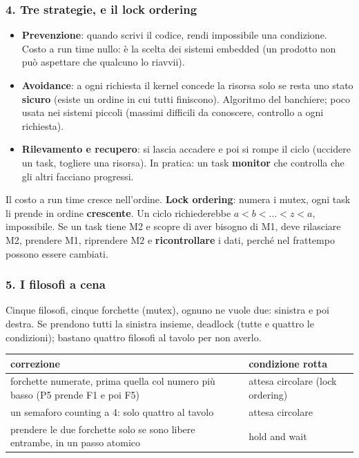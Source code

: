\subsubsection*{4. Tre strategie, e il lock ordering}
\begin{itemize}
    \item \textbf{Prevenzione}: quando scrivi il codice, rendi impossibile una condizione. Costo a run time nullo: è la scelta dei sistemi embedded (un prodotto non può aspettare che qualcuno lo riavvii).
    \item \textbf{Avoidance}: a ogni richiesta il kernel concede la risorsa solo se resta uno stato \textbf{sicuro} (esiste un ordine in cui tutti finiscono). Algoritmo del banchiere; poco usata nei sistemi piccoli (massimi difficili da conoscere, controllo a ogni richiesta).
    \item \textbf{Rilevamento e recupero}: si lascia accadere e poi si rompe il ciclo (uccidere un task, togliere una risorsa). In pratica: un task \textbf{monitor} che controlla che gli altri facciano progressi.
\end{itemize}
Il costo a run time cresce nell'ordine. \textbf{Lock ordering}: numera i mutex, ogni task li prende in ordine \textbf{crescente}. Un ciclo richiederebbe $a < b < \dots < z < a$, impossibile. Se un task tiene M2 e scopre di aver bisogno di M1, deve rilasciare M2, prendere M1, riprendere M2 e \textbf{ricontrollare} i dati, perché nel frattempo possono essere cambiati.

\subsubsection*{5. I filosofi a cena}
Cinque filosofi, cinque forchette (mutex), ognuno ne vuole due: sinistra e poi destra. Se prendono tutti la sinistra insieme, deadlock (tutte e quattro le condizioni); bastano quattro filosofi al tavolo per non averlo.
\begin{center}
\small
\begin{tabular}{P{0.5} P{0.4}}
    \hline
    \textbf{correzione} & \textbf{condizione rotta} \\
    \hline
    forchette numerate, prima quella col numero più basso (P5 prende F1 e poi F5) & attesa circolare (lock ordering) \\
    un semaforo counting a 4: solo quattro al tavolo & attesa circolare \\
    prendere le due forchette solo se sono libere entrambe, in un passo atomico & hold and wait \\
    \hline
\end{tabular}
\end{center}

